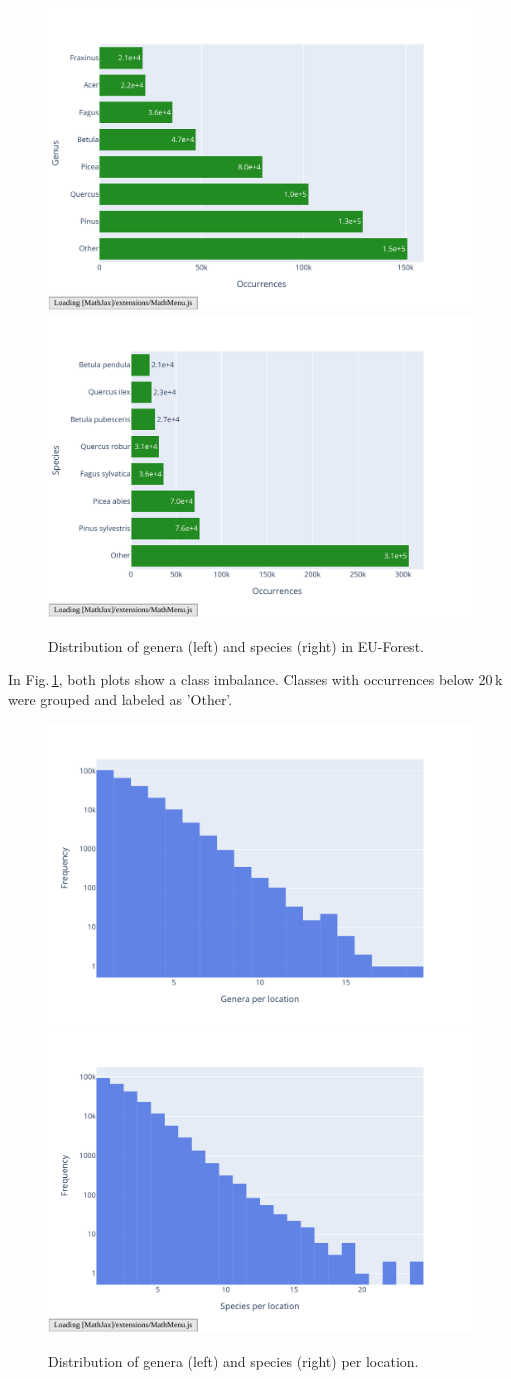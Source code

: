 \begin{figure}[!htb]
    \centering

    \includegraphics[width=0.48\linewidth, trim={0 0 2cm 0}]{figures_labels/genus_cutoff.pdf}
    \includegraphics[width=0.48\linewidth, trim={0 0 2cm 0}]{figures_labels/species_cutoff.pdf}

    \caption{Distribution of genera (left) and species (right) in EU-Forest.}
    \label{fig:cutoff_barplots}
\end{figure}

In Fig.\,\ref{fig:cutoff_barplots}, both plots show a class imbalance. 
Classes with occurrences below 20\,k were grouped and labeled as 'Other'.

\begin{figure}[!htb]
    \centering

    \includegraphics[width=0.48\linewidth, trim={0 0 2cm 0}]{figures_labels/grouped_genus.pdf}%
    \includegraphics[width=0.48\linewidth, trim={0 0 2cm 0}]{figures_labels/grouped_species.pdf}

    \caption{Distribution of genera (left) and species (right) per location.}
    \label{fig:grouped_histograms}
\end{figure}

